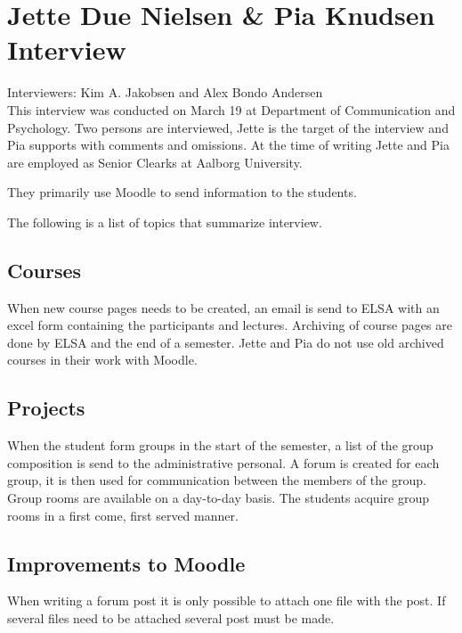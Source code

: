 \section{Jette Due Nielsen \& Pia Knudsen Interview}
\label{sec:jettePia}
Interviewers: Kim A. Jakobsen and Alex Bondo Andersen\\

This interview was conducted on March 19\ths{} at Department of Communication and Psychology.
Two persons are interviewed, Jette is the target of the interview and Pia supports with comments and omissions. 
At the time of writing Jette and Pia are employed as Senior Clearks at Aalborg University.

They primarily use Moodle to send information to the students. 

The following is a list of topics that summarize interview.

\subsection*{Courses}
When new course pages needs to be created, an email is send to ELSA with an excel form containing the participants and lectures.
Archiving of course pages are done by ELSA and the end of a semester. 
Jette and Pia do not use old archived courses in their work with Moodle.

\subsection*{Projects}
When the student form groups in the start of the semester, a list of the group composition is send to the administrative personal. 
A forum is created for each group, it is then used for communication between the members of the group.
Group rooms are available on a day-to-day basis.
The students acquire group rooms in a first come, first served manner.

\subsection*{Improvements to Moodle}
When writing a forum post it is only possible to attach one file with the post. 
If several files need to be attached several post must be made. 
